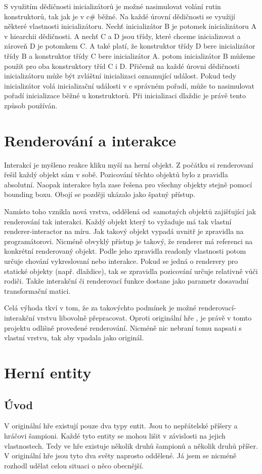 S využitím dědičnosti inicializátorů je možné nasimulovat volání rutin konstruktorů, tak jak je v c\#  běžné. Na každé úrovní dědičnosti
se využijí některé vlastnosti inicializátoru. Nechť inicializátor B
je potomek inicializátoru A v hiearchii dědičnosti. A nechť C a D jsou třídy, které chceme inicializovat a zároveň D je potomkem C.
A také platí, že konstruktor třídy D bere inicializátor třídy B a konstruktor třídy C bere inicializátor A. potom inicializátor B můžeme
použít pro oba konstruktory tříd C i D. Přičemž na každé úrovni dědičnosti inicializátoru může být zvláštní inicializaci oznamující událost.
Pokud tedy inicializátor volá inicializační události v e správném pořadí, může to nasimulovat pořadí inicializace běžné u konstruktorů.
Při inicializaci dlaždic je právě tento způsob používán.

\section{Renderování a interakce}
Interakcí je myšleno reakce kliku myší na herní objekt. Z počátku si renderovaní řešil každý objekt sám v sobě. Pozicování
těchto objektů bylo z pravidla absolutní. Naopak interakce byla zase řešena pro všechny objekty stejně pomocí bounding boxu.
Obojí se později ukázalo jako špatný přístup. 

Namísto toho vznikla nová vrstva, oddělená od~samotných objektů zajišťující jak renderování tak interakci. Každý objekt
který to vyžaduje má tak vlastní renderer-interactor na míru. Jak takový objekt vypadá uvnitř je zpravidla na programátorovi. 
Nicméně obvyklý přístup je takový, že renderer má referenci na konkrétní renderovaný objekt. Podle jeho zpravidla readonly vlastnosti potom určuje
chování vykreslovaní nebo interakce. Pokud se jedná o renderery pro statické objekty (např. dlaždice), tak se zpravidla pozicování určuje relativně
vůči rodiči. Takže interakční či renderovací funkce dostane jako parametr dosavadní transformační matici.

Celá výhoda tkví v tom, že za takovýchto podmínek je možné renderovací-interakční vrstvu libovolně přepracovat. Oproti originální hře
, je právě v tomto projektu odlišně provedené renderování. Nicméně nic nebraní tomu napsati s vlastní vrstvu, tak aby vpadala jako originál.

\section{Herní entity}
\subsection{Úvod}
V originální hře existují pouze dva typy entit. Jsou to nepřátelské příšery a hráčovi šampioni. Každé tyto entity se mohou lišit 
v závislosti na jejich vlastnostech. Tedy ve hře existuje několik druhů šampionů a několik druhů příšer. V originální hře jsou 
tyto dva světy naprosto oddělené. Já jsem se nicméně rozhodl udělat celou situaci o něco obecnější.

